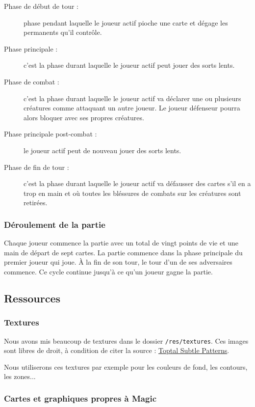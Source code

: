 \documentclass[a4paper,12pt]{article}
\begin{document}
\begin{description}
\item[Phase de début de tour :] phase pendant laquelle le joueur actif pioche une carte et dégage les permanents qu'il contrôle.
\item[Phase principale :] c'est la phase durant laquelle le joueur actif peut jouer des sorts lents.
\item[Phase de combat :] c'est la phase durant laquelle le joueur actif va déclarer une ou plusieurs créatures comme attaquant un autre joueur. Le joueur défenseur pourra alors bloquer avec ses propres créatures.
\item[Phase principale post-combat :] le joueur actif peut de nouveau jouer des sorts lents.
\item[Phase de fin de tour :] c'est la phase durant laquelle le joueur actif va défausser des cartes s'il en a trop en main et où toutes les bléssures de combats sur les créatures sont retirées.
\end{description}

\subsubsection{Déroulement de la partie}

Chaque joueur commence la partie avec un total de vingt points de vie et une main de départ de sept cartes.
La partie commence dans la phase principale du premier joueur qui joue.
À la fin de son tour, le tour d'un de ses adversaires commence.
Ce cycle continue jusqu'à ce qu'un joueur gagne la partie.

\subsection{Ressources}

\subsubsection{Textures}

Nous avons mis beaucoup de textures dans le dossier \texttt{/res/textures}.
Ces images sont libres de droit, à condition de citer la source : \href{https://www.toptal.com/designers/subtlepetterns}{Toptal Subtle Patterns}.

Nous utiliserons ces textures par exemple pour les couleurs de fond, les contours, les zones...

\subsubsection{Cartes et graphiques propres à Magic}
\end{document}
